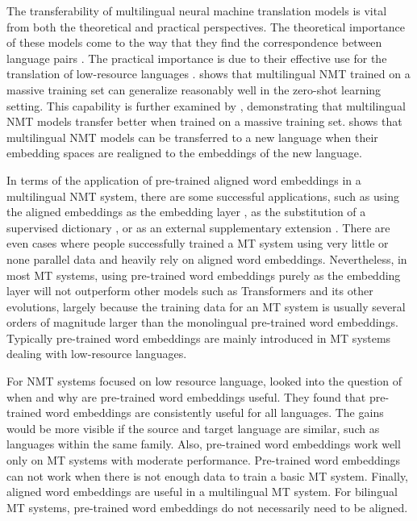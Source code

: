 \documentclass[thesis,fonts=libertine]{cluu}
\begin{document}
The transferability of multilingual neural machine translation models is vital from both the theoretical and practical perspectives. The theoretical importance of these models come to the way that they find the correspondence between language pairs \parencite{Johnson:2016aa,lu-etal-2018-neural}. The practical importance is due to their effective use for the translation of low-resource languages \parencite{Zoph:2016aa,Nguyen:2017aa}. \cite{Johnson:2016aa} shows that multilingual NMT trained on a massive training set can generalize reasonably well in the zero-shot learning setting. This capability is further examined by \cite{aharoni-etal-2019-massively}, demonstrating that multilingual NMT models transfer better when trained on a massive training set. \cite{Kim:2019aa} shows that multilingual NMT models can be transferred to a new language when their embedding spaces are realigned to the embeddings of the new language.

In terms of the application of pre-trained aligned word embeddings in a multilingual NMT system, there are some successful applications, such as using the aligned embeddings as the embedding layer \parencite{neishi-etal-2017-bag, Artetxe:2017aa}, as the substitution of a supervised dictionary \parencite{Conneau:2017aa}, or as an external supplementary extension \parencite{inproceedings}. There are even cases where people successfully trained a MT system using very little or none parallel data \parencite{Conneau:2017aa} and heavily rely on aligned word embeddings. Nevertheless, in most MT systems, using pre-trained word embeddings purely as the embedding layer will not outperform other models such as Transformers \parencite{Vaswani:2017aa} and its other evolutions, largely because the training data for an MT system is usually several orders of magnitude larger than the monolingual pre-trained word embeddings. Typically pre-trained word embeddings are mainly introduced in MT systems dealing with low-resource languages.

For NMT systems focused on low resource language, \cite{Qi:2018aa} looked into the question of when and why are pre-trained word embeddings useful. They found that pre-trained word embeddings are consistently useful for all languages. The gains would be more visible if the source and target language are similar, such as languages within the same family. Also, pre-trained word embeddings work well only on MT systems with moderate performance. Pre-trained word embeddings can not work when there is not enough data to train a basic MT system. Finally, aligned word embeddings are useful in a multilingual MT system. For bilingual MT systems, pre-trained word embeddings do not necessarily need to be aligned.
\end{document}
